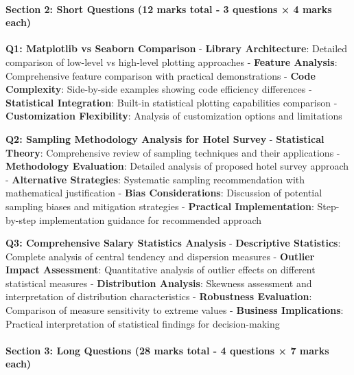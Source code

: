 \documentclass[11pt]{article}
\begin{document}
\paragraph{\texorpdfstring{\textbf{Section 2: Short Questions (12 marks
total - 3 questions × 4 marks
each)}}{Section 2: Short Questions (12 marks total - 3 questions × 4 marks each)}}\label{section-2-short-questions-12-marks-total---3-questions-4-marks-each}

\textbf{Q1: Matplotlib vs Seaborn Comparison} - \textbf{Library
Architecture}: Detailed comparison of low-level vs high-level plotting
approaches - \textbf{Feature Analysis}: Comprehensive feature comparison
with practical demonstrations - \textbf{Code Complexity}: Side-by-side
examples showing code efficiency differences - \textbf{Statistical
Integration}: Built-in statistical plotting capabilities comparison -
\textbf{Customization Flexibility}: Analysis of customization options
and limitations

\textbf{Q2: Sampling Methodology Analysis for Hotel Survey} -
\textbf{Statistical Theory}: Comprehensive review of sampling techniques
and their applications - \textbf{Methodology Evaluation}: Detailed
analysis of proposed hotel survey approach - \textbf{Alternative
Strategies}: Systematic sampling recommendation with mathematical
justification - \textbf{Bias Considerations}: Discussion of potential
sampling biases and mitigation strategies - \textbf{Practical
Implementation}: Step-by-step implementation guidance for recommended
approach

\textbf{Q3: Comprehensive Salary Statistics Analysis} -
\textbf{Descriptive Statistics}: Complete analysis of central tendency
and dispersion measures - \textbf{Outlier Impact Assessment}:
Quantitative analysis of outlier effects on different statistical
measures - \textbf{Distribution Analysis}: Skewness assessment and
interpretation of distribution characteristics - \textbf{Robustness
Evaluation}: Comparison of measure sensitivity to extreme values -
\textbf{Business Implications}: Practical interpretation of statistical
findings for decision-making

\paragraph{\texorpdfstring{\textbf{Section 3: Long Questions (28 marks
total - 4 questions × 7 marks
each)}}{Section 3: Long Questions (28 marks total - 4 questions × 7 marks each)}}\label{section-3-long-questions-28-marks-total---4-questions-7-marks-each}
\end{document}
